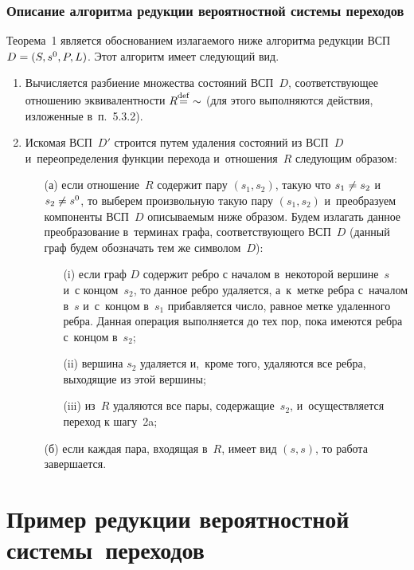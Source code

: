 \begin{multicols}{2}
\subsubsection{Описание алгоритма редукции вероятностной системы переходов}

Теорема~1 является обоснованием
излагаемого ниже алгоритма редукции ВСП
$D\hm=(S,s^0,P,L)$. Этот алгоритм имеет следующий вид.
\begin{enumerate}[1.]
\item Вычисляется разбиение множества состояний ВСП~$D$,
соответствующее отношению эквивалентности $R\mathbin{{\mathop{=}\limits^{\mathrm{def}}}} \sim$ (для этого
выполняются действия, изложенные в~п.~5.3.2).
\item Искомая ВСП~$D'$ строится путем
удаления состояний из ВСП~$D$ и~переопределения функции перехода и~отношения~$R$
следующим образом:
\begin{itemize}
\item[(а)] если
отношение~$R$ содержит пару $(s_1, s_2)$, такую что
$s_1\hm\neq s_2$ и~$s_2\hm\neq s^0$, то выберем произвольную такую
пару $(s_1, s_2)$ и~преобразуем компоненты ВСП~$D$ описываемым ниже образом. Будем
излагать данное преобразование в~терминах графа, соответствующего
ВСП~$D$ (данный граф будем обозначать тем же символом~$D$):
\begin{itemize}
\item[(i)]
если граф $D$ содержит ребро с началом в~некоторой вершине~$s$
и~с концом~$s_2$, то данное ребро удаляется, а~к~метке ребра
с~началом в~$s$ и~с~концом в~$s_1$ прибавляется число, равное метке
удаленного ребра. Данная операция выполняется до тех пор, пока
имеются ребра с~концом в~$s_2$;
\item[(ii)] вершина $s_2$ удаляется и,~кроме того, удаляются все ребра,
выходящие из этой вершины;
\item[(iii)] из~$R$ удаляются все пары, содержащие~$s_2$, и~осуществляется
переход к шагу~2a;
\end{itemize}

\item[(б)] если каждая пара, входящая в~$R$, имеет
вид $(s,s)$, то   работа завершается.
\end{itemize}
\end{enumerate}

\section{Пример редукции вероятностной системы~переходов}


\end{multicols}
